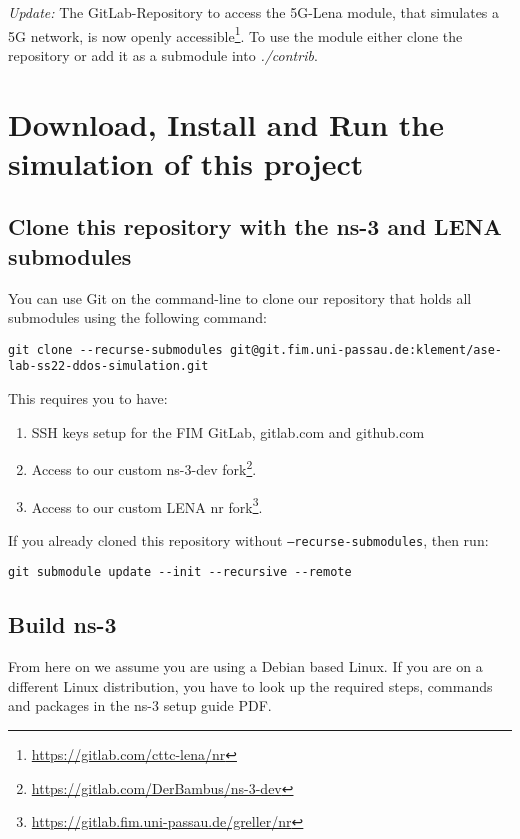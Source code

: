 \textit{Update:} The GitLab-Repository to access the 5G-Lena module, that simulates a 5G network, is now openly accessible\footnote[6]{\url{https://gitlab.com/cttc-lena/nr}}.
To use the module either clone the repository or add it as a submodule into \textit{./contrib}.

\section{Download, Install and Run the simulation of this project}
\label{section:install-project}

\subsection{Clone this repository with the ns-3 and LENA submodules}
You can use Git on the command-line to clone our repository that holds all submodules using the following command:

\begin{verbatim}
git clone --recurse-submodules git@git.fim.uni-passau.de:klement/ase-lab-ss22-ddos-simulation.git
\end{verbatim}

This requires you to have:
\begin{enumerate}
    \item SSH keys setup for the FIM GitLab, gitlab.com and github.com
    \item Access to our custom ns-3-dev fork\footnote[7]{\url{https://gitlab.com/DerBambus/ns-3-dev}}.
    \item Access to our custom LENA nr fork\footnote[8]{\url{https://gitlab.fim.uni-passau.de/greller/nr}}.
\end{enumerate}

If you already cloned this repository without \texttt{--recurse-submodules}, then run:
\begin{verbatim}
git submodule update --init --recursive --remote
\end{verbatim}

\subsection{Build ns-3}
From here on we assume you are using a Debian based Linux. If you are on a different Linux distribution, you have to look up the required steps, commands and packages in the ns-3 setup guide PDF.


